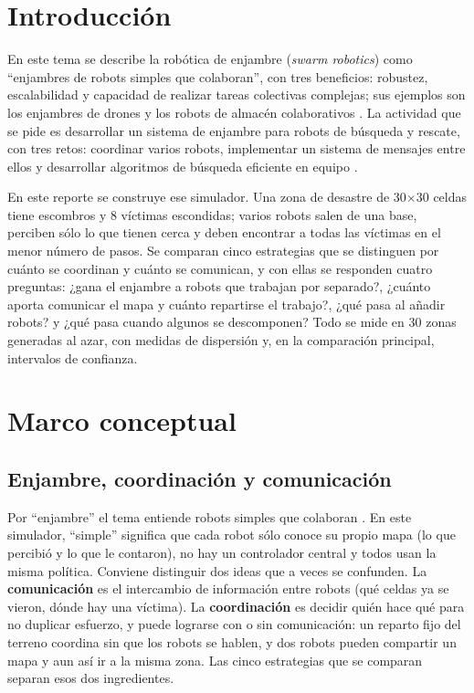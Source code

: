 \documentclass[11pt,letterpaper]{article}
\begin{document}
\portada
\indicegeneral

\section{Introducción}

En este tema se describe la robótica de enjambre (\emph{swarm robotics}) como ``enjambres de robots simples que colaboran'', con tres beneficios: robustez, escalabilidad y capacidad de realizar tareas colectivas complejas; sus ejemplos son los enjambres de drones y los robots de almacén colaborativos \parencite{iae_u4_t46}. La actividad que se pide es desarrollar un sistema de enjambre para robots de búsqueda y rescate, con tres retos: coordinar varios robots, implementar un sistema de mensajes entre ellos y desarrollar algoritmos de búsqueda eficiente en equipo \parencite{iae_u4_t46}.

En este reporte se construye ese simulador. Una zona de desastre de 30$\times$30 celdas tiene escombros y 8 víctimas escondidas; varios robots salen de una base, perciben sólo lo que tienen cerca y deben encontrar a todas las víctimas en el menor número de pasos. Se comparan cinco estrategias que se distinguen por cuánto se coordinan y cuánto se comunican, y con ellas se responden cuatro preguntas: ¿gana el enjambre a robots que trabajan por separado?, ¿cuánto aporta comunicar el mapa y cuánto repartirse el trabajo?, ¿qué pasa al añadir robots? y ¿qué pasa cuando algunos se descomponen? Todo se mide en 30 zonas generadas al azar, con medidas de dispersión y, en la comparación principal, intervalos de confianza.

\section{Marco conceptual}

\subsection{Enjambre, coordinación y comunicación}

Por ``enjambre'' el tema entiende robots simples que colaboran \parencite{iae_u4_t46}. En este simulador, ``simple'' significa que cada robot sólo conoce su propio mapa (lo que percibió y lo que le contaron), no hay un controlador central y todos usan la misma política. Conviene distinguir dos ideas que a veces se confunden. La \textbf{comunicación} es el intercambio de información entre robots (qué celdas ya se vieron, dónde hay una víctima). La \textbf{coordinación} es decidir quién hace qué para no duplicar esfuerzo, y puede lograrse con o sin comunicación: un reparto fijo del terreno coordina sin que los robots se hablen, y dos robots pueden compartir un mapa y aun así ir a la misma zona. Las cinco estrategias que se comparan separan esos dos ingredientes.
\end{document}
